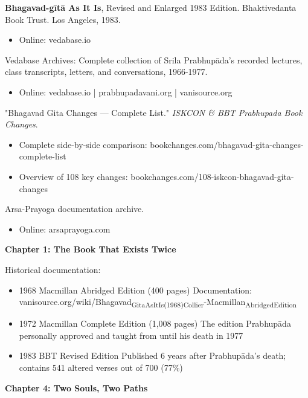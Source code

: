 \documentclass[12pt,twoside]{book}
\begin{document}
\textbf{Bhagavad-gītā As It Is}, Revised and Enlarged 1983 Edition. Bhaktivedanta Book Trust. Los Angeles, 1983.
\begin{itemize}
\item Online: vedabase.io
\end{itemize}

Vedabase Archives: Complete collection of Srila Prabhupāda's recorded lectures, class transcripts, letters, and conversations, 1966-1977.
\begin{itemize}
\item Online: vedabase.io | prabhupadavani.org | vanisource.org
\end{itemize}

"Bhagavad Gita Changes — Complete List." \emph{ISKCON \& BBT Prabhupada Book Changes}.
\begin{itemize}
\item Complete side-by-side comparison: bookchanges.com/bhagavad-gita-changes-complete-list
\item Overview of 108 key changes: bookchanges.com/108-iskcon-bhagavad-gita-changes
\end{itemize}

Arsa-Prayoga documentation archive.
\begin{itemize}
\item Online: arsaprayoga.com
\end{itemize}

\vspace{0.5cm}

\textbf{\textbf{Chapter 1: The Book That Exists Twice}}

Historical documentation:
\begin{itemize}
\item 1968 Macmillan Abridged Edition (400 pages)
Documentation: vanisource.org/wiki/Bhagavad\textsubscript{Gita}\textsubscript{As}\textsubscript{It}\textsubscript{Is}\textsubscript{(1968)}\textsubscript{Collier}-Macmillan\textsubscript{Abridged}\textsubscript{Edition}
\item 1972 Macmillan Complete Edition (1,008 pages)
The edition Prabhupāda personally approved and taught from until his death in 1977
\item 1983 BBT Revised Edition
Published 6 years after Prabhupāda's death; contains 541 altered verses out of 700 (77\%)
\end{itemize}

\vspace{0.5cm}

\textbf{\textbf{Chapter 4: Two Souls, Two Paths}}
\end{document}
